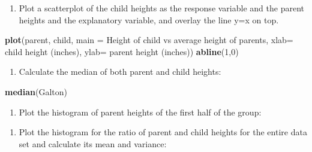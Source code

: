 \documentclass[
]{book}
\newenvironment{Shaded}{\begin{snugshade}}{\end{snugshade}}
\newcommand{\DataTypeTok}[1]{\textcolor[rgb]{0.13,0.29,0.53}{#1}}
\newcommand{\DecValTok}[1]{\textcolor[rgb]{0.00,0.00,0.81}{#1}}
\newcommand{\KeywordTok}[1]{\textcolor[rgb]{0.13,0.29,0.53}{\textbf{#1}}}
\newcommand{\NormalTok}[1]{#1}
\newcommand{\OperatorTok}[1]{\textcolor[rgb]{0.81,0.36,0.00}{\textbf{#1}}}
\newcommand{\StringTok}[1]{\textcolor[rgb]{0.31,0.60,0.02}{#1}}
\providecommand{\tightlist}{%
  \setlength{\itemsep}{0pt}\setlength{\parskip}{0pt}}
\theoremstyle{definition}
\theoremstyle{definition}
\theoremstyle{definition}
\theoremstyle{remark}
\begin{document}
\begin{enumerate}
\def\labelenumi{\arabic{enumi}.}
\setcounter{enumi}{2}
\tightlist
\item
  Plot a scatterplot of the child heights as the response variable and the parent heights and the explanatory variable, and overlay the line y=x on top.
\end{enumerate}

\begin{Shaded}
\begin{Highlighting}[]
\KeywordTok{plot}\NormalTok{(parent, child, }\DataTypeTok{main =} \StringTok{\textquotesingle{}Height of child vs average height of parents\textquotesingle{}}\NormalTok{, }\DataTypeTok{xlab=} \StringTok{\textquotesingle{}child height (inches)\textquotesingle{}}\NormalTok{, }\DataTypeTok{ylab=} \StringTok{\textquotesingle{}parent height (inches)\textquotesingle{}}\NormalTok{)}
\KeywordTok{abline}\NormalTok{(}\DecValTok{1}\NormalTok{,}\DecValTok{0}\NormalTok{)}
\end{Highlighting}
\end{Shaded}

\begin{enumerate}
\def\labelenumi{\arabic{enumi}.}
\setcounter{enumi}{3}
\tightlist
\item
  Calculate the median of both parent and child heights:
\end{enumerate}

\begin{Shaded}
\begin{Highlighting}[]
\KeywordTok{median}\NormalTok{(Galton)}
\end{Highlighting}
\end{Shaded}

\begin{enumerate}
\def\labelenumi{\arabic{enumi}.}
\setcounter{enumi}{4}
\tightlist
\item
  Plot the histogram of parent heights of the first half of the group:
\end{enumerate}

\begin{Shaded}
\end{Shaded}

\begin{enumerate}
\def\labelenumi{\arabic{enumi}.}
\setcounter{enumi}{5}
\tightlist
\item
  Plot the histogram for the ratio of parent and child heights for the entire data set and calculate its mean and variance:
\end{enumerate}
\end{document}
